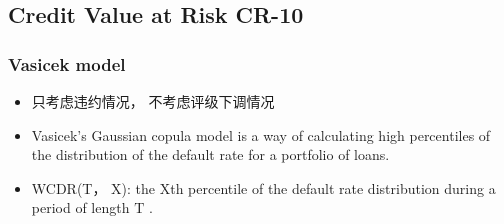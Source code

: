 \subsection{Credit Value at Risk CR-10}


\subsubsection{Vasicek model
}

\begin{itemize}
\item 只考虑违约情况， 不考虑评级下调情况
\end{itemize}

\begin{itemize}
\item Vasicek's Gaussian copula model is a way of calculating high percentiles of the distribution of the default rate for a portfolio of loans.
\end{itemize}

\begin{itemize}
\item WCDR(T， X): the Xth percentile of the default rate distribution during a period of length \(\mathrm{T}\) .
\end{itemize}

